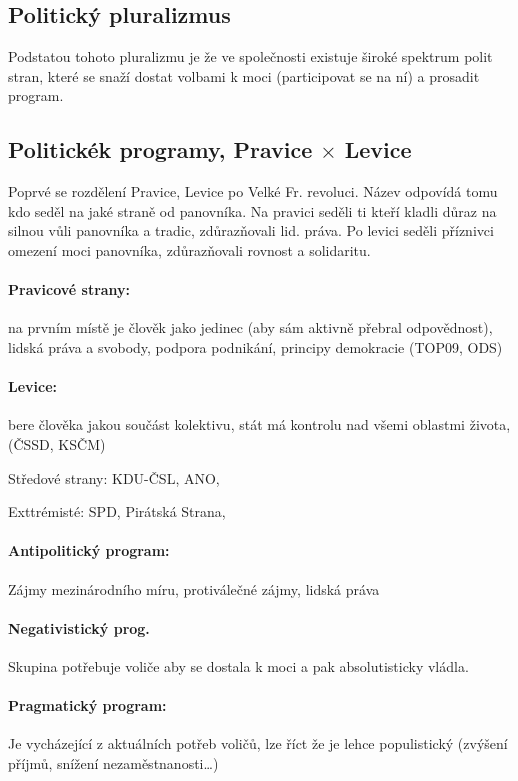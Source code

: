 \documentclass[10pt,a4paper,
twoside,%
]{report}
\begin{document}
\subsection{Politický pluralizmus}
Podstatou tohoto pluralizmu je že ve společnosti existuje široké spektrum polit stran, které se snaží dostat volbami k moci (participovat se na ní) a prosadit program.
\subsection{Politickék programy, Pravice $\times$ Levice}
Poprvé se rozdělení Pravice, Levice po Velké Fr. revoluci. Název odpovídá tomu kdo seděl na jaké straně od panovníka. Na pravici seděli ti kteří kladli důraz na silnou vůli panovníka a tradic, zdůrazňovali lid. práva. Po levici seděli příznivci omezení moci panovníka, zdůrazňovali rovnost a solidaritu.
\paragraph{Pravicové strany:} na prvním místě je člověk jako jedinec (aby sám aktivně přebral odpovědnost), lidská práva a svobody, podpora podnikání, principy demokracie  (TOP09, ODS)

\paragraph{Levice:} bere člověka jakou součást kolektivu, stát má kontrolu nad všemi oblastmi života,  (ČSSD, KSČM)

Středové strany: KDU-ČSL, ANO,

Exttrémisté: SPD, Pirátská Strana, 

\paragraph{Antipolitický program:}
Zájmy mezinárodního míru, protiválečné zájmy, lidská práva 

\paragraph{Negativistický prog.} Skupina potřebuje voliče aby se dostala k moci a pak absolutisticky vládla.

\paragraph{Pragmatický program:} Je vycházející z aktuálních potřeb voličů, lze říct že je lehce populistický (zvýšení příjmů, snížení nezaměstnanosti\dots )
\end{document}
